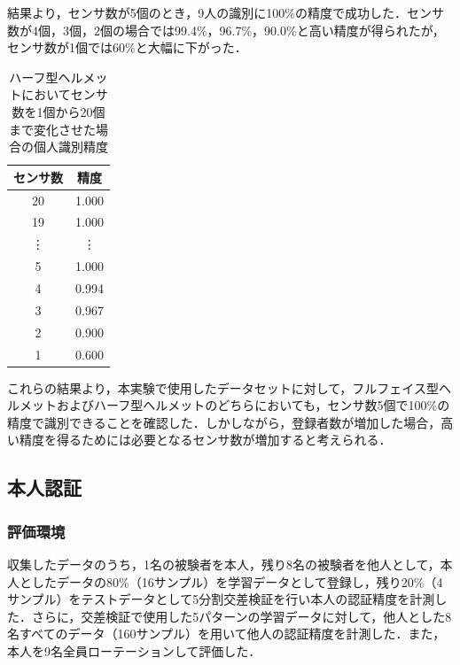 \documentclass[Japanese,noauthor]{dicomopapers}
\begin{document}
結果より，センサ数が5個のとき，9人の識別に100\%の精度で成功した．センサ数が4個，3個，2個の場合では99.4\%，96.7\%，90.0\%と高い精度が得られたが，センサ数が1個では60\%と大幅に下がった．

\begin{table}[!t]
  \centering
  \caption{ハーフ型ヘルメットにおいてセンサ数を1個から20個まで変化させた場合の個人識別精度}
  \begin{tabular}{c|c} \hline\hline
    センサ数 & 精度 \\ \hline
    20 & 1.000 \\
    19 & 1.000 \\
    \vdots & \vdots \\
    5 & 1.000 \\
    4 & 0.994 \\
    3 & 0.967 \\
    2 & 0.900 \\
    1 & 0.600 \\ \hline
  \end{tabular}
  \label{half_num}
\end{table}

これらの結果より，本実験で使用したデータセットに対して，フルフェイス型ヘルメットおよびハーフ型ヘルメットのどちらにおいても，センサ数5個で100\%の精度で識別できることを確認した．しかしながら，登録者数が増加した場合，高い精度を得るためには必要となるセンサ数が増加すると考えられる．


\subsection{本人認証}
\subsubsection{評価環境}
収集したデータのうち，1名の被験者を本人，残り8名の被験者を他人として，本人としたデータの80\%（16サンプル）を学習データとして登録し，残り20\%（4サンプル）をテストデータとして5分割交差検証を行い本人の認証精度を計測した．さらに，交差検証で使用した5パターンの学習データに対して，他人とした8名すべてのデータ（160サンプル）を用いて他人の認証精度を計測した．また，本人を9名全員ローテーションして評価した．\par
\end{document}
